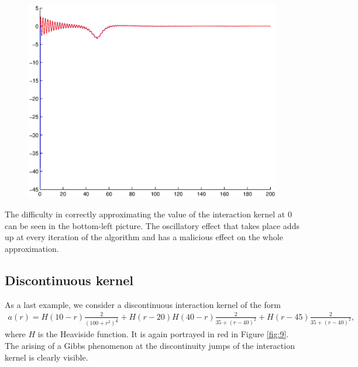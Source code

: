 \documentclass[A4paper,11pt]{article}
\theoremstyle{definition}
\begin{document}
\begin{figure}[H]
\begin{minipage}{.33\textwidth}
  \centering
  \vspace{0.2cm}
  \includegraphics[scale=0.25]{pictures/Example8/Fig9.eps}
  \label{fig:8_7}
\end{minipage}%
\caption{}
\label{fig:8}
\end{figure}

The difficulty in correctly approximating the value of the interaction kernel at 0 can be seen in the bottom-left picture. The oscillatory effect that takes place adds up at every iteration of the algorithm and has a malicious effect on the whole approximation.

\subsection{Discontinuous kernel}

As a last example, we consider a discontinuous interaction kernel of the form
\begin{align*}
a(r) = H(10 - r)\frac{2}{(100+r^2)^{\frac{4}{5}}} + H(r - 20)H(40 - r)\frac{2}{35 + (r - 40)^2} + H(r - 45)\frac{2}{35 + (r - 40)^2},
\end{align*}
where $H$ is the Heaviside function. It is again portrayed in red in Figure \ref{fig:9}. The arising of a Gibbs phenomenon at the discontinuity jumps of the interaction kernel is clearly visible.
\end{document}
